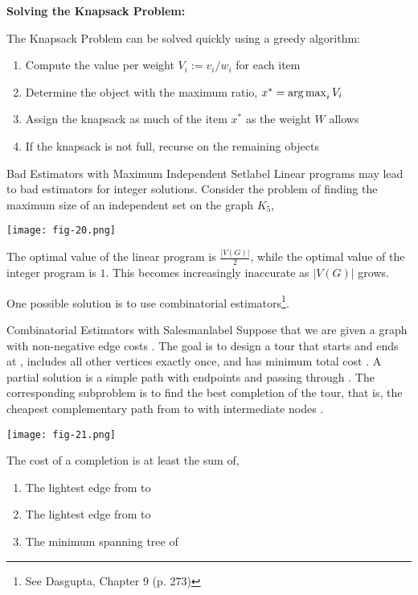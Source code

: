 \begin{marginfigure}
	\textbf{Solving the Knapsack Problem:}

	\noindent The Knapsack Problem can be solved quickly using a greedy algorithm:
	\begin{enumerate}
		\item Compute the value per weight $V_i := v_i / w_i$ for each item
		\item Determine the object with the maximum ratio, $x^* = \operatorname*{arg\,max}_i V_i$
		\item Assign the knapsack as much of the item $x^*$ as the weight $W$ allows
		\item If the knapsack is not full, recurse on the remaining objects 
	\end{enumerate}
\end{marginfigure}

\begin{ex}{Bad Estimators with Maximum Independent Set}{label}
	Linear programs may lead to bad estimators for integer solutions. Consider the problem of finding the maximum size of an independent set on the graph $K_5$,
	\begin{center}
		\texttt{[image: fig-20.png]}
	\end{center}
	\noindent The optimal value of the linear program is $\frac{|V(G)|}{2}$, while the optimal value of the integer program is $1$. This becomes increasingly inaccurate as $|V(G)|$ grows.
\end{ex}

\noindent One possible solution is to use combinatorial estimators\footnote{See Dasgupta, Chapter 9 (p. 273)}.

\begin{ex}{Combinatorial Estimators with Salesman}{label}
	Suppose that we are given a graph  with non-negative edge costs . The goal is to design a tour  that starts and ends at , includes all other vertices exactly once, and has minimum total cost . A partial solution  is a simple path  with endpoints  and  passing through . The corresponding subproblem is to find the best completion of the tour, that is, the cheapest complementary path from  to  with intermediate nodes .
	\begin{center}
		\texttt{[image: fig-21.png]}
	\end{center}
	The cost of a completion is at least the sum of,
	\begin{enumerate}
		\item The lightest edge from  to 
		\item The lightest edge from  to 
		\item The minimum spanning tree of 
	\end{enumerate}
\end{ex}


